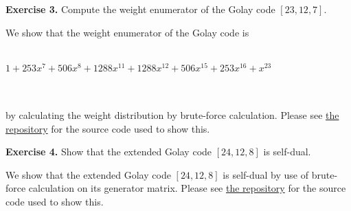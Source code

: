 \documentclass[12pt]{article}
\begin{document}
\noindent \textbf{Exercise 3.} Compute the weight enumerator of the Golay code $[23, 12, 7]$.\\
\begin{adjustwidth}{0.5cm}{}
We show that the weight enumerator of the Golay code is\\\\
	\centerline{$1 + 253x^7 + 506x^8 + 1288x^{11} + 1288x^{12} + 506x^{15} + 253x^{16} + x^{23}$}\\\\
by calculating the weight distribution by brute-force calculation.  Please see \href{https://github.com/whatsacomputertho/math-468-homework-5}{the repository} for the source code used to show this.\\
\end{adjustwidth}

\noindent \textbf{Exercise 4.} Show that the extended Golay code $[24, 12, 8]$ is self-dual.\\
\begin{adjustwidth}{0.5cm}{}
We show that the extended Golay code $[24, 12, 8]$ is self-dual by use of brute-force calculation on its generator matrix.  Please see \href{https://github.com/whatsacomputertho/math-468-homework-5}{the repository} for the source code used to show this.\\
\end{adjustwidth}
\end{document}
